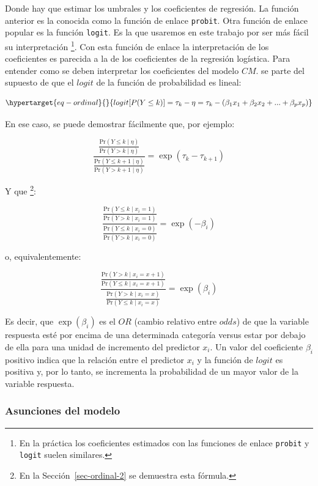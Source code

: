 \documentclass[
  12pt,
  a4paper,
  extrafontsizes,
  onecolumn,
  openright,
  table]{memoir}
\begin{document}
Donde hay que estimar los umbrales y los coeficientes de regresión. La
función anterior es la conocida como la función de enlace
\texttt{probit}. Otra función de enlace popular es la función
\texttt{logit}. Es la que usaremos en este trabajo por ser más fácil su
interpretación \footnote{En la práctica los coeficientes estimados con
  las funciones de enlace \texttt{probit} y \texttt{logit} suelen
  similares.}. Con esta función de enlace la interpretación de los
coeficientes es parecida a la de los coeficientes de la regresión
logística. Para entender como se deben interpretar los coeficientes del
modelo \(CM\). se parte del supuesto de que el \(logit\) de la función
de probabilidad es lineal:

\begin{equation}\protect\hypertarget{eq-ordinal}{}{
logit [P(Y \le k)] = \tau_{k} - \eta = \tau_{k} - (\beta_1 x_1 + \beta_2 x_2 + ... + \beta_p x_p)
}\label{eq-ordinal}\end{equation}

En ese caso, se puede demostrar fácilmente que, por ejemplo:

\[\frac{\frac{\mathrm{Pr}(Y \leq k \mid \eta)}{\mathrm{Pr}(Y > k \mid \eta)}}{\frac{\mathrm{Pr}(Y \leq k+1 \mid \eta)}{\mathrm{Pr}(Y > k+1 \mid \eta)}} = \exp(\tau_{k} - \tau_{k+1})\]

Y que \footnote{En la Sección~\ref{sec-ordinal-2} se demuestra esta
  fórmula.}:

\[\frac{\frac{\mathrm{Pr}(Y \leq k \mid x_i = 1)}{\mathrm{Pr}(Y > k \mid x_i = 1)}}{\frac{\mathrm{Pr}(Y \leq k \mid x_i=0)}{\mathrm{Pr}(Y > k \mid x_i = 0)}} = \exp(-\beta_{i})\]

o, equivalentemente:

\[\frac{\frac{\mathrm{Pr}(Y > k \mid x_i = x + 1)}{\mathrm{Pr}(Y \leq k \mid x_i = x + 1)}}{\frac{\mathrm{Pr}(Y > k \mid x_i = x)}{\mathrm{Pr}(Y \leq k \mid x_i = x)}} = \exp(\beta_{i})\]

Es decir, que \(\exp(\beta_{i})\) es el \(OR\) (cambio relativo entre
\(odds\)) de que la variable respuesta esté por encima de una
determinada categoría versus estar por debajo de ella para una unidad de
incremento del predictor \(x_i\). Un valor del coeficiente \(\beta_i\)
positivo indica que la relación entre el predictor \(x_i\) y la función
de \(logit\) es positiva y, por lo tanto, se incrementa la probabilidad
de un mayor valor de la variable respuesta.

\hypertarget{asunciones-del-modelo}{%
\subsubsection{Asunciones del modelo}\label{asunciones-del-modelo}}
\end{document}
